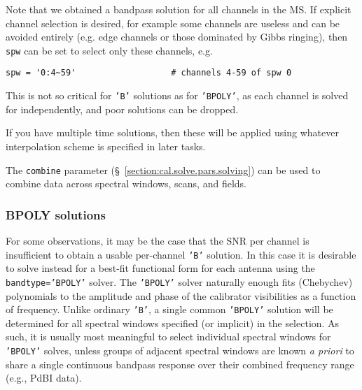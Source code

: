 Note that we obtained a bandpass solution for all channels in the MS.
If explicit channel selection is desired, for example some channels 
are useless and can be avoided entirely (e.g. edge channels or those
dominated by Gibbs ringing), then {\tt spw} can be set to select only
these channels, e.g.
\small
\begin{verbatim}
spw = '0:4~59'                   # channels 4-59 of spw 0
\end{verbatim}
\normalsize
This is not so critical for {\tt 'B'} solutions as for {\tt 'BPOLY'},
as each channel is solved for independently, and poor solutions
can be dropped.

If you have multiple time solutions, then these will be applied using
whatever interpolation scheme is specified in later tasks. 

The {\tt combine} parameter (\S~\ref{section:cal.solve.pars.solving}) 
can be used to combine data across spectral windows, scans, and fields.

\subsubsection{BPOLY solutions}
\label{section:cal.solve.band.bpoly}

For some observations, it may be the case that the SNR per channel is
insufficient to obtain a usable per-channel {\tt 'B'} solution.  In this
case it is desirable to solve instead for a best-fit functional form
for each antenna using the {\tt bandtype='BPOLY'} solver. 
The {\tt 'BPOLY'} solver naturally enough fits (Chebychev) polynomials to the
amplitude and phase of the calibrator 
visibilities as a function of frequency.  Unlike ordinary {\tt 'B'}, a
single common {\tt 'BPOLY'} solution will be determined for all spectral
windows specified (or implicit) in the selection.  As
such, it is usually most meaningful to select individual spectral
windows for {\tt 'BPOLY'} solves, unless groups of adjacent spectral windows
are known {\it a priori} to share a single continuous bandpass
response over their combined frequency range (e.g., PdBI data).

